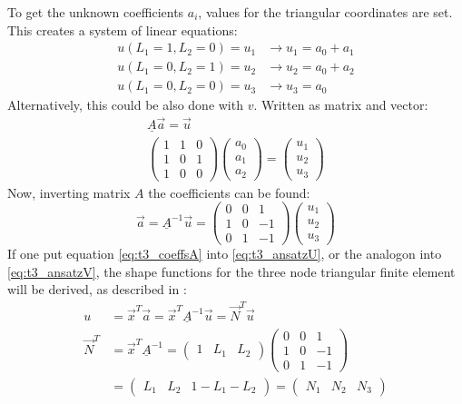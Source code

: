   To get the unknown coefficients $a_i$, values for the triangular coordinates are set. This creates a system of linear equations:
  \begin{align}
  u(L_1=1, L_2=0) = u_1 &\rightarrow u_1 = a_0 + a_1 \nonumber\\
  u(L_1=0, L_2=1) = u_2 &\rightarrow u_2 = a_0 + a_2 \nonumber\\
  u(L_1=0, L_2=0) = u_3 &\rightarrow u_3 = a_0
  \end{align}
  Alternatively, this could be also done with $v$. Written as matrix and vector:
  \begin{align}
  \underline{A} \vec{a} = \vec{u} \nonumber\\
  \begin{pmatrix}
  1 & 1 & 0\\
  1 & 0 & 1\\
  1 & 0 & 0
  \end{pmatrix} \begin{pmatrix}
  a_0 \\ a_1 \\ a_2
  \end{pmatrix} = \begin{pmatrix}
  u_1 \\ u_2 \\ u_3
  \end{pmatrix}
  \end{align}
  Now, inverting matrix $A$ the coefficients can be found:
  \begin{equation}\label{eq:t3_coeffsA}
  \vec{a} = \underline{A}^{-1} \vec{u} = \begin{pmatrix}
  0 & 0 & 1\\
  1 & 0 & -1\\
  0 & 1 & -1
  \end{pmatrix} \begin{pmatrix}
  u_1 \\ u_2 \\ u_3
  \end{pmatrix}
  \end{equation}
  If one put equation \ref{eq:t3_coeffsA} into \ref{eq:t3_ansatzU}, or the analogon into \ref{eq:t3_ansatzV}, the shape functions for the three node triangular finite element will be derived, as described in \cite{steinke2005finite}:
  \begin{align}\label{eq:t3SF}
  u &= \vec{x}^T \vec{a} = \vec{x}^T \underline{A}^{-1}\vec{u} = \vec{N}^T\vec{u} \nonumber\\
  \vec{N}^T &= \vec{x}^T \underline{A}^{-1} =
  \begin{pmatrix}
  1 & L_1 & L_2
  \end{pmatrix} \begin{pmatrix}
  0 & 0 & 1\\
  1 & 0 & -1\\
  0 & 1 & -1
  \end{pmatrix} \nonumber\\
  &= \begin{pmatrix}
  L_1 & L_2 & 1-L_1-L_2
  \end{pmatrix} = \begin{pmatrix}
  N_1 & N_2 & N_3
  \end{pmatrix}
  \end{align}
